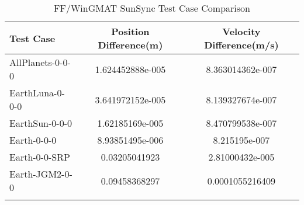 \begin{table}[htbp!]
\centering
\caption{ FF/WinGMAT SunSync Test Case Comparison}
      \begin{tabular}{lcc}
      \hline\hline
          Test Case & Position Difference(m) & Velocity Difference(m/s) \\
         \hline
         AllPlanets-0-0-0 & 1.624452888e-005 & 8.363014362e-007 \\
         EarthLuna-0-0-0 & 3.641972152e-005 & 8.139327674e-007 \\
         EarthSun-0-0-0 & 1.62185169e-005 & 8.470799538e-007 \\
         Earth-0-0-0 & 8.93851495e-006 & 8.215195e-007 \\
         Earth-0-0-SRP & 0.03205041923 & 2.81000432e-005 \\
         Earth-JGM2-0-0 & 0.09458368297 & 0.0001055216409 \\
      \hline\hline
      \label{Table: SunSync FF-WinGMAT Table} 
\end{tabular}
\end{table}
